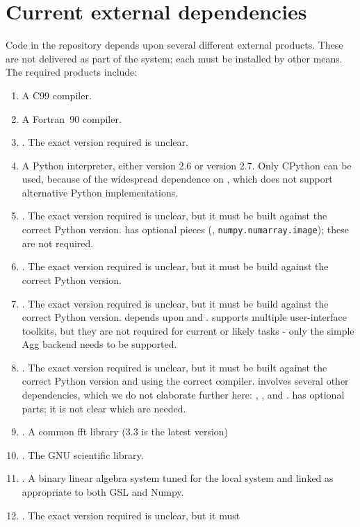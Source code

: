 \documentclass{memarticle}
\newcommand{\cosmosis}{\name{CosmoSIS}\xspace}
\newcommand{\despipe}{\name{des-pipe}\xspace}
\begin{document}
\section{Current external dependencies}

Code in the \despipe repository depends upon several different
external products. These are not delivered as part of the
\despipe system; each must be installed by other means. The
required products include:
\begin{enumerate}
\item A C99 compiler.
\item A Fortran~90 compiler.
\item {}. The exact version required is unclear.
\item A Python interpreter, either version 2.6 or version 2.7. Only
  CPython can be used, because of the widespread dependence on
  , which does not support alternative Python
  implementations.
\item {}. The exact version required is unclear, but it must
  be built against the correct Python version.  has optional
  pieces (\eg, \texttt{numpy.numarray.image}); these are not required.
\item {}. The exact version required is unclear, but it must
  be build against the correct Python version.
\item {}. The exact version required is unclear, but it
  must be build against the correct Python version. 
  depends upon  and .  supports
  multiple user-interface toolkits, but they are not required for current
  or likely \cosmosis tasks - only the simple Agg backend needs to be supported.
\item {}. The exact version required is unclear, but it must
  be built against the correct Python version and using the correct
  \cpp{} compiler.  involves several other dependencies,
  which we do not elaborate further here: ,
  , and .  has optional parts; it is
  not clear which are needed.
\item {}. A common fft library (3.3 is the latest version)
\item {}.  The GNU scientific library.
\item {}. A binary linear algebra system tuned for the local
  system and linked as appropriate to both GSL and Numpy.
\item {}. The exact version required is unclear, but it must

\end{enumerate}
\end{document}
